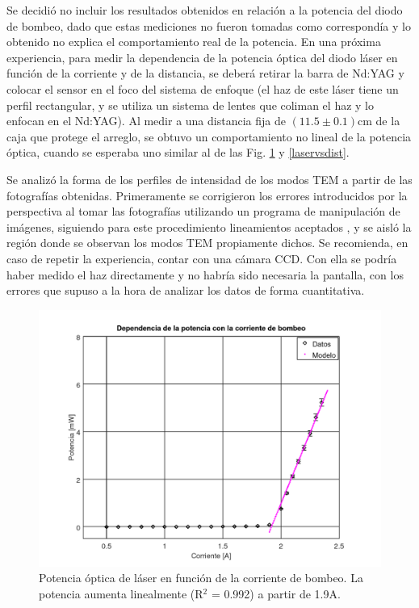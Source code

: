 \documentclass[10pt, a4paper]{article}%
\begin{document}
\begin{multicols}{2}
Se decidió no incluir los resultados obtenidos en relación a la potencia del diodo de bombeo, dado que estas mediciones no fueron tomadas como correspondía y lo obtenido no explica el comportamiento real de la potencia. En una próxima experiencia, para medir la dependencia de la potencia óptica del diodo láser en función de la corriente y de la distancia, se deberá retirar la barra de Nd:YAG y colocar el sensor en el foco del sistema de enfoque (el haz de este láser tiene un perfil rectangular, y se utiliza un sistema de lentes que coliman el haz y lo enfocan en el Nd:YAG). Al medir a una distancia fija de $(11.5 \pm 0.1)$cm de la caja que protege el arreglo, se obtuvo un comportamiento no lineal de la potencia óptica, cuando se esperaba uno similar al de las Fig. \ref{laservscorr} y \ref{laservsdist}.

Se analizó la forma de los perfiles de intensidad de los modos TEM a partir de las fotografías obtenidas. Primeramente se corrigieron los errores introducidos por la perspectiva al tomar las fotografías utilizando un programa de manipulación de imágenes, siguiendo para este procedimiento lineamientos aceptados \cite{3}, y se aisló la región donde se observan los modos TEM propiamente dichos. Se recomienda, en caso de repetir la experiencia, contar con una cámara CCD. Con ella se podría haber medido el haz directamente y no habría sido necesaria la pantalla, con los errores que supuso a la hora de analizar los datos de forma cuantitativa.

\begin{figure}[H]
    \centering
    \includegraphics[scale=0.4]{Graficos/potvscor.png}
    \caption{Potencia óptica de láser en función de la corriente de bombeo. La potencia aumenta linealmente (R$^2$ = 0.992) a partir de 1.9A.}
    \label{laservscorr}
\end{figure}


\end{multicols}
\end{document}
